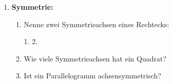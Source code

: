 \begin{enumerate}[label=\arabic*.]
    \item \textbf{Symmetrie:}
    \vspace{0.5cm}

    \begin{enumerate}[label=\alph*)]
        \item Nenne zwei Symmetrieachsen eines Rechtecks:

        1. \underline{\hspace{4cm}} \hspace{1cm} 2. \underline{\hspace{4cm}}

        \vspace{0.5cm}

        \item Wie viele Symmetrieachsen hat ein Quadrat? \underline{\hspace{3cm}}

        \vspace{0.5cm}

        \item Ist ein Parallelogramm achsensymmetrisch? \underline{\hspace{3cm}}
    \end{enumerate}
\end{enumerate}
